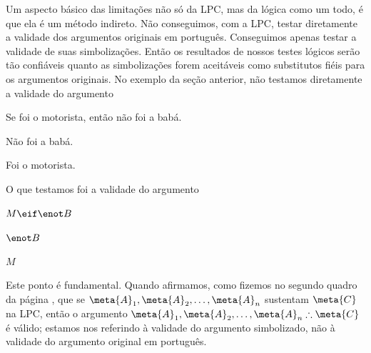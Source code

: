 Um aspecto básico das limitações não só da LPC, mas da lógica como um todo, é que ela é um método indireto.
Não conseguimos, com a LPC, testar diretamente a validade dos argumentos originais em português.
Conseguimos apenas testar a validade de suas simbolizações.
Então os resultados de nossos testes lógicos serão tão confiáveis quanto as simbolizações forem aceitáveis como substitutos fiéis para os argumentos originais.
No exemplo da seção anterior, não testamos diretamente a validade do argumento
	\begin{earg}
		\item[] Se foi o motorista, então não foi a babá.
		\item[] Não foi a babá.
		\item[\therefore] Foi o motorista.
	\end{earg}
O que testamos foi a validade do argumento
	\begin{earg}
		\item[] $M \eif \enot B$
		\item[] $\enot B$
		\item[\therefore] $M$
	\end{earg}

Este ponto é fundamental.
Quando afirmamos, como fizemos no segundo quadro da página \pageref{SusVal}, que se $\meta{A}_1, \meta{A}_2, \ldots, \meta{A}_n$ sustentam $\meta{C}$ na LPC, então o argumento  $\meta{A}_1, \meta{A}_2, \ldots, \meta{A}_n \therefore \meta{C}$ é  válido; estamos nos referindo à validade do argumento simbolizado, não à validade do argumento original em português.

